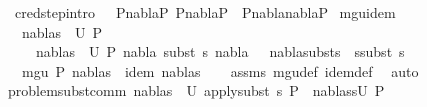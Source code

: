 \begin{isabellebody}
\ \ cred{\isacharunderscore}{\kern0pt}step{\isacharbrackleft}{\kern0pt}intro{\isacharbang}{\kern0pt}{\isacharbrackright}{\kern0pt}{\isacharcolon}{\kern0pt}\ \ \ {\isachardoublequoteopen}{\isasymlbrakk}P{}{\isasymturnstile}nabla{}{\isasymrightarrow}P{}{\isacharsemicolon}{\kern0pt}\ P{}{\isasymTurnstile}{\isacharparenleft}{\kern0pt}nabla{}{\isacharcomma}{\kern0pt}{\isacharbrackleft}{\kern0pt}{\isacharbrackright}{\kern0pt}{\isacharparenright}{\kern0pt}{\isasymRightarrow}P{}{\isasymrbrakk}\ {\isasymLongrightarrow}\ P{}{\isasymTurnstile}{\isacharparenleft}{\kern0pt}nabla{}{\isasymunion}nabla{}{\isacharcomma}{\kern0pt}{\isacharbrackleft}{\kern0pt}{\isacharbrackright}{\kern0pt}{\isacharparenright}{\kern0pt}{\isasymRightarrow}P{}{\isachardoublequoteclose}\isanewline
\isanewline
\isanewline
{}\isamarkupfalse%
\ mgu{\isacharunderscore}{\kern0pt}idem{\isacharcolon}{\kern0pt}\ \isanewline
\ \ \ {\isachardoublequoteopen}{\isacharparenleft}{\kern0pt}nabla{}{\isacharcomma}{\kern0pt}s{}{\isacharparenright}{\kern0pt}\ {\isasymin}\ U\ P{\isachardoublequoteclose}\isanewline
\ \ \ \ \ {\isachardoublequoteopen}{\isasymforall}{\isacharparenleft}{\kern0pt}nabla{}{\isacharcomma}{\kern0pt}s{}{\isacharparenright}{\kern0pt}\ {\isasymin}\ U\ P{\isachardot}{\kern0pt}\ nabla{}\ {\isasymTurnstile}{\isacharparenleft}{\kern0pt}subst\ s{}{\isacharparenright}{\kern0pt}\ nabla{}\ {\isasymand}\ \ nabla{}{\isasymTurnstile}subst{\isacharparenleft}{\kern0pt}s{}\ {\isasymbullet}\ s{}{\isacharparenright}{\kern0pt}{\isasymapprox}subst\ s{}{\isachardoublequoteclose}\isanewline
\ \ \ {\isachardoublequoteopen}mgu\ P\ {\isacharparenleft}{\kern0pt}nabla{}{\isacharcomma}{\kern0pt}s{}{\isacharparenright}{\kern0pt}\ {\isasymand}\ idem\ {\isacharparenleft}{\kern0pt}nabla{}{\isacharcomma}{\kern0pt}s{}{\isacharparenright}{\kern0pt}{\isachardoublequoteclose}\isanewline
%
\isadelimproof
\ \ %
\endisadelimproof
%
\isatagproof
{}\isamarkupfalse%
\ assms\ mgu{\isacharunderscore}{\kern0pt}def\ idem{\isacharunderscore}{\kern0pt}def\ \isamarkupfalse%
\ auto%
\endisatagproof
{\isafoldproof}%
%
\isadelimproof
\isanewline
%
\endisadelimproof
\isanewline
\isanewline
{}\isamarkupfalse%
\ problem{\isacharunderscore}{\kern0pt}subst{\isacharunderscore}{\kern0pt}comm{\isacharcolon}{\kern0pt}\ {\isachardoublequoteopen}{\isacharparenleft}{\kern0pt}{\isacharparenleft}{\kern0pt}nabla{\isacharcomma}{\kern0pt}s{}{\isacharparenright}{\kern0pt}\ {\isasymin}\ U\ {\isacharparenleft}{\kern0pt}apply{\isacharunderscore}{\kern0pt}subst\ s{}\ P{\isacharparenright}{\kern0pt}{\isacharparenright}{\kern0pt}\ {\isacharequal}{\kern0pt}\ {\isacharparenleft}{\kern0pt}{\isacharparenleft}{\kern0pt}nabla{\isacharcomma}{\kern0pt}{\isacharparenleft}{\kern0pt}s{}{\isasymbullet}s{}{\isacharparenright}{\kern0pt}{\isacharparenright}{\kern0pt}{\isasymin}U\ P{\isacharparenright}{\kern0pt}{\isachardoublequoteclose}\isanewline

\end{isabellebody}
